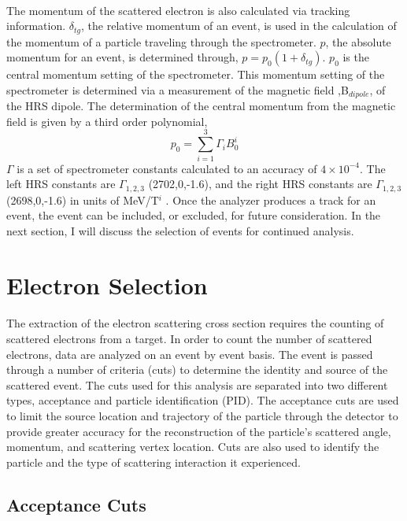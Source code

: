 \paragraph{}The momentum of the scattered electron is also calculated via tracking information.  $\delta_{tg}$, the relative momentum of an event, is used in the calculation of the momentum of a particle traveling through the spectrometer. $p$, the absolute momentum for an event, is determined through, $p = p_0(1+\delta_{tg})$. $p_0$ is the central momentum setting of the spectrometer. This momentum setting of the spectrometer is determined via a measurement of the magnetic field ,B$_{dipole}$, of the HRS dipole. The determination of the central momentum from the magnetic field is given by a third order polynomial,
\begin{equation}
p_0 = \sum_{i=1}^{3} \Gamma_iB_0^i
\end{equation}
$\Gamma$ is a set of spectrometer constants calculated to an accuracy of $4\times10^{-4}$. The left HRS constants are $\Gamma_{1,2,3}$ (2702,0,-1.6), and the right HRS constants are $\Gamma_{1,2,3}$ (2698,0,-1.6) in units of MeV/T$^i$ \cite{HallA}. Once the analyzer produces a track for an event, the event can be included, or excluded, for future consideration. In the next section, I will discuss the selection of events for continued analysis.
 
\section{Electron Selection}\label{sec:ES}
\paragraph{} The extraction of the electron scattering cross section requires the counting of scattered electrons from a target. In order to count the number of scattered electrons, data are analyzed on an event by event basis. The event is passed through a number of criteria (cuts) to determine the identity and source of the scattered event. The cuts used for this analysis are separated into two different types, acceptance and particle identification (PID). The acceptance cuts are used to limit the source location and trajectory of the particle through the detector to provide greater accuracy for the reconstruction of the particle's scattered angle, momentum, and scattering vertex location. Cuts are also used to identify the particle and the type of scattering interaction it experienced. 
\subsection{Acceptance Cuts}
